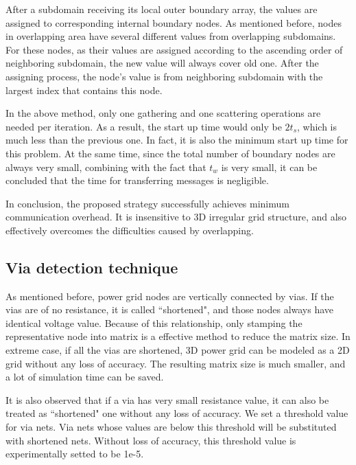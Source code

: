 \documentclass{sig-alternate}
\begin{document}
	After a subdomain receiving its local outer boundary array, the values are assigned to corresponding internal boundary 
	nodes. As 
	mentioned before, nodes in overlapping area have several different values from overlapping subdomains. For these nodes, 
	as their values are assigned according to the ascending order of neighboring subdomain, the new value will always cover old one. 
	After the assigning process, the node's value is from neighboring subdomain with the largest index that contains this node.  
	
	In the above method, only one gathering and one scattering operations are needed per iteration. As a result, the start up time 
	would only be $2t_s$, which is much less than the previous one. In fact, it is also the minimum 
	start up time for this problem. At the same time, since the total number 
	of boundary nodes are always very small, combining with the fact that $t_w$ is very small, it can be concluded that the 
	time for transferring messages is negligible. 

	In conclusion, the proposed strategy successfully achieves minimum communication overhead. It is insensitive to 3D irregular 
	grid structure, and also effectively overcomes the difficulties caused by overlapping.	
  \subsection{Via detection technique}
	As mentioned before, power grid nodes are vertically connected by vias. If the vias are of no 
	resistance, it is called ``shortened", and those nodes always have identical voltage value. Because of this relationship, 
	only stamping the representative
	node into matrix is a effective method to reduce the matrix size. In extreme case, if all the
	vias are shortened, 3D power grid can be modeled as a 2D grid without any loss of accuracy. The resulting matrix size
	is much smaller, and a lot of simulation time can be saved. 
 
	It is also observed that if a via has very small resistance value, it can also be treated as ``shortened" one 
	without any loss of accuracy. We set a threshold value for via nets. Via nets 
	whose values are below this threshold will be substituted with shortened nets. Without loss of accuracy, this threshold value 
	is experimentally setted to be 1e-5. 
\end{document}
